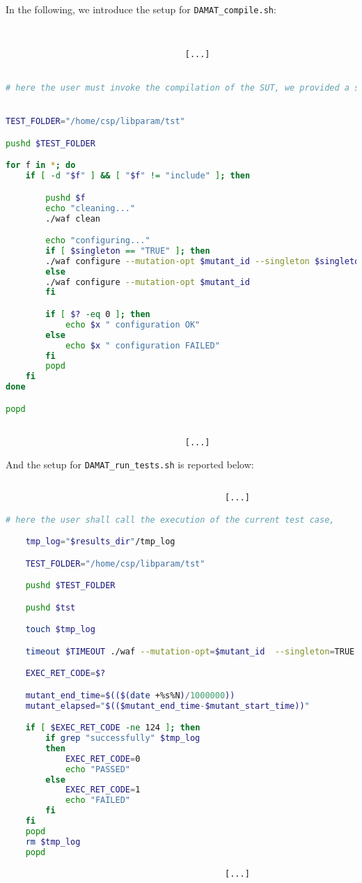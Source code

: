In the following, we introduce the setup for \texttt{DAMAT\_compile.sh}:

\begin{lstlisting}[language=bash]


									[...]


# here the user must invoke the compilation of the SUT, we provided a simple example.


TEST_FOLDER="/home/csp/libparam/tst"

pushd $TEST_FOLDER

for f in *; do
    if [ -d "$f" ] && [ "$f" != "include" ]; then

        pushd $f
        echo "cleaning..."
        ./waf clean

        echo "configuring..."
        if [ $singleton == "TRUE" ]; then
        ./waf configure --mutation-opt $mutant_id --singleton $singleton
        else
        ./waf configure --mutation-opt $mutant_id
        fi

        if [ $? -eq 0 ]; then
            echo $x " configuration OK"
        else
            echo $x " configuration FAILED"
        fi
        popd
    fi
done

popd


									[...]


\end{lstlisting}

And the setup for \texttt{DAMAT\_run\_tests.sh} is reported below:

\begin{lstlisting}[language=bash]

											[...]

# here the user shall call the execution of the current test case,

    tmp_log="$results_dir"/tmp_log

    TEST_FOLDER="/home/csp/libparam/tst"

    pushd $TEST_FOLDER

    pushd $tst

    touch $tmp_log

    timeout $TIMEOUT ./waf --mutation-opt=$mutant_id  --singleton=TRUE 2>&1 | tee $tmp_log

    EXEC_RET_CODE=$?

    mutant_end_time=$(($(date +%s%N)/1000000))
    mutant_elapsed="$(($mutant_end_time-$mutant_start_time))"

    if [ $EXEC_RET_CODE -ne 124 ]; then
        if grep "successfully" $tmp_log
        then
            EXEC_RET_CODE=0
            echo "PASSED"
        else
            EXEC_RET_CODE=1
            echo "FAILED"
        fi
    fi
    popd
    rm $tmp_log
    popd

											[...]

\end{lstlisting}

